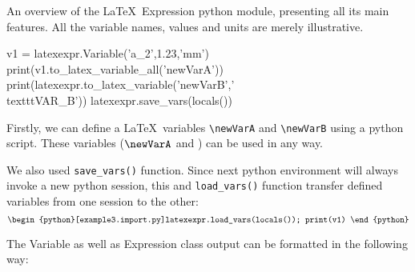\documentclass{report}
\begin{document}
An overview of the \LaTeX\ Expression python module, presenting all its main features.
All the variable names, values and units are merely illustrative.
\begin{python}
	v1 = latexexpr.Variable('a_2',1.23,'mm')
	print(v1.to_latex_variable_all('newVarA'))
	print(latexexpr.to_latex_variable('newVarB','\\texttt{VAR\_B}'))
	latexexpr.save_vars(locals())
\end{python}

Firstly, we can define a \LaTeX\ variables \texttt{\textbackslash newVarA}
and \texttt{\textbackslash newVarB} using a python script.
These variables ($\newVarA$ and \newVarB) can be used in any way.

We also used \texttt{save_vars()} function.
Since next python environment will always invoke a new python session,
this and \texttt{load_vars()} function transfer defined variables from one session to the other:
$$
\begin{python}[example3.import.py]latexexpr.load_vars(locals()); print(v1) \end{python}
$$

The Variable as well as Expression class output can be formatted in the following way:
\end{document}
